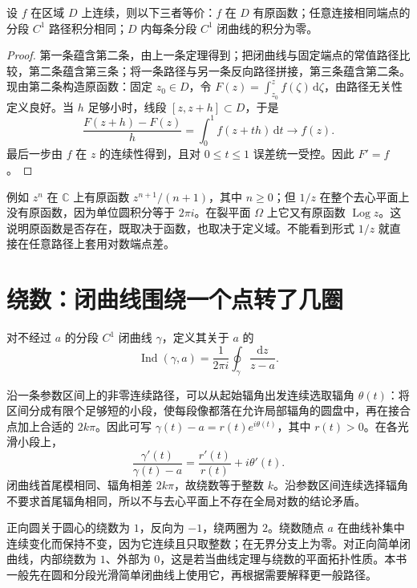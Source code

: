 \documentclass[UTF8,12pt,a4paper,fontset=fandol]{ctexbook}
\begin{document}
\begin{theorem}[原函数存在的等价条件]
\label{thm:cv-primitive-equivalence}
设 $f$ 在区域 $D$ 上连续，则以下三者等价：$f$ 在 $D$ 有原函数；任意连接相同端点的分段 $C^1$ 路径积分相同；$D$ 内每条分段 $C^1$ 闭曲线的积分为零。
\end{theorem}
\begin{proof}
第一条蕴含第二条，由上一条定理得到；把闭曲线与固定端点的常值路径比较，第二条蕴含第三条；将一条路径与另一条反向路径拼接，第三条蕴含第二条。现由第二条构造原函数：固定 $z_0\in D$，令 $F(z)=\int_{z_0}^z f(\zeta)\,\mathrm d\zeta$，由路径无关性定义良好。当 $h$ 足够小时，线段 $[z,z+h]\subset D$，于是
\[
 \frac{F(z+h)-F(z)}h=\int_0^1f(z+th)\,\mathrm dt\longrightarrow f(z).
\]
最后一步由 $f$ 在 $z$ 的连续性得到，且对 $0\le t\le1$ 误差统一受控。因此 $F'=f$。
\end{proof}

例如 $z^n$ 在 $\mathbb C$ 上有原函数 $z^{n+1}/(n+1)$，其中 $n\ge0$；但 $1/z$ 在整个去心平面上没有原函数，因为单位圆积分等于 $2\pi i$。在裂平面 $\Omega$ 上它又有原函数 $\operatorname{Log}z$。这说明原函数是否存在，既取决于函数，也取决于定义域。不能看到形式 $1/z$ 就直接在任意路径上套用对数端点差。

\section{绕数：闭曲线围绕一个点转了几圈}

\begin{definition}[绕数]
对不经过 $a$ 的分段 $C^1$ 闭曲线 $\gamma$，定义其关于 $a$ 的
\begin{equation}
 \operatorname{Ind}(\gamma,a)=\frac1{2\pi i}\oint_\gamma\frac{\mathrm dz}{z-a}.
 \label{eq:cv-index}
\end{equation}
\end{definition}

沿一条参数区间上的非零连续路径，可以从起始辐角出发连续选取辐角 $\theta(t)$：将区间分成有限个足够短的小段，使每段像都落在允许局部辐角的圆盘中，再在接合点加上合适的 $2k\pi$。因此可写 $\gamma(t)-a=r(t)e^{i\theta(t)}$，其中 $r(t)>0$。在各光滑小段上，
\[
 \frac{\gamma'(t)}{\gamma(t)-a}=\frac{r'(t)}{r(t)}+i\theta'(t).
\]
闭曲线首尾模相同、辐角相差 $2k\pi$，故绕数等于整数 $k$。沿参数区间连续选择辐角不要求首尾辐角相同，所以不与去心平面上不存在全局对数的结论矛盾。

正向圆关于圆心的绕数为 $1$，反向为 $-1$，绕两圈为 $2$。绕数随点 $a$ 在曲线补集中连续变化而保持不变，因为它连续且只取整数；在无界分支上为零。对正向简单闭曲线，内部绕数为 $1$、外部为 $0$，这是若当曲线定理与绕数的平面拓扑性质。本书一般先在圆和分段光滑简单闭曲线上使用它，再根据需要解释更一般路径。
\end{document}
